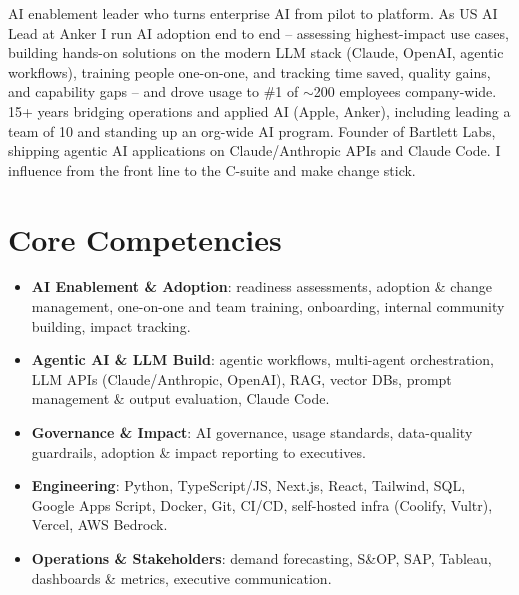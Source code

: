 \documentclass[11pt,letterpaper,sans]{moderncv}
\begin{document}
\makecvtitle


\vspace{6pt}
\small{AI enablement leader who turns enterprise AI from pilot to platform. As US AI Lead at Anker I run AI adoption end to end -- assessing highest-impact use cases, building hands-on solutions on the modern LLM stack (Claude, OpenAI, agentic workflows), training people one-on-one, and tracking time saved, quality gains, and capability gaps -- and drove usage to \#1 of $\sim$200 employees company-wide. 15+ years bridging operations and applied AI (Apple, Anker), including leading a team of 10 and standing up an org-wide AI program. Founder of Bartlett Labs, shipping agentic AI applications on Claude/Anthropic APIs and Claude Code. I influence from the front line to the C-suite and make change stick.}


\section{Core Competencies}
\vspace{1pt}
\begin{itemize}

\item \textbf{AI Enablement \& Adoption}: readiness assessments, adoption \& change management, one-on-one and team training, onboarding, internal community building, impact tracking.

\item \textbf{Agentic AI \& LLM Build}: agentic workflows, multi-agent orchestration, LLM APIs (Claude/Anthropic, OpenAI), RAG, vector DBs, prompt management \& output evaluation, Claude Code.

\item \textbf{Governance \& Impact}: AI governance, usage standards, data-quality guardrails, adoption \& impact reporting to executives.

\item \textbf{Engineering}: Python, TypeScript/JS, Next.js, React, Tailwind, SQL, Google Apps Script, Docker, Git, CI/CD, self-hosted infra (Coolify, Vultr), Vercel, AWS Bedrock.

\item \textbf{Operations \& Stakeholders}: demand forecasting, S\&OP, SAP, Tableau, dashboards \& metrics, executive communication.

\end{itemize}
\end{document}
